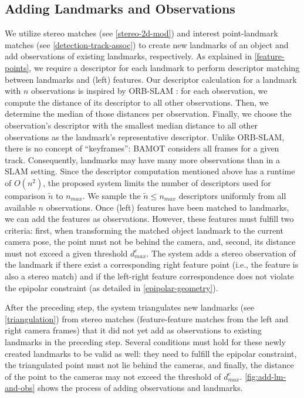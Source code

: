 \documentclass[headsepline, hidelinks, footsepline, footinclude=false, oneside, fontsize=11pt, paper=a4, listof=totoc, bibliography=totoc]{scrbook}
\begin{document}
\subsection{Adding Landmarks and Observations \label{adding-lms-and-obs}}
\label{sec:orgc423021}
    We utilize stereo matches (see \cref{stereo-2d-mod}) and interest point-landmark matches (see \cref{detection-track-assoc}) to create new landmarks of an object and add observations of existing landmarks, respectively.
As explained in \cref{feature-points}, we require a descriptor for each landmark to perform descriptor matching between landmarks and (left) features. 
Our descriptor calculation for a landmark with \(n\) observations is inspired by ORB-SLAM \cite{mur-artalORBSLAMVersatileAccurate2015a,mur-artalORBSLAM2OpenSourceSLAM2017}: 
for each observation, we compute the distance of its descriptor to all other observations. Then, we determine the median of those distances per observation. Finally, 
we choose the observation's descriptor with the smallest median distance to all other observations as the landmark's representative descriptor. 
Unlike ORB-SLAM, there is no concept of ``keyframes'': BAMOT considers all frames for a given track. Consequently, landmarks may have many more observations than in a 
SLAM setting. Since the descriptor computation mentioned above has a runtime of \(O(n^2)\), the proposed system limits the number of descriptors used for comparison \(\tilde{n}\) to \(n_{max}\).
We sample the \(\tilde{n} \leq n_{max}\) descriptors uniformly from all available \(n\) observations.
Once (left) features have been matched to landmarks, we can add the features as observations. 
However, these features must fulfill two criteria: first, when transforming the matched object landmark to the current camera pose,
the point must not be behind the camera, and, second, its distance must not exceed a given threshold \(d_{max}^c\).
The system adds a stereo observation of the landmark if there exist a corresponding right feature point (i.e., the feature is also a stereo match) 
and if the left-right feature correspondence does not violate the epipolar constraint (as detailed in \cref{epipolar-geometry}).

After the preceding step, the system triangulates new landmarks (see \cref{triangulation}) from stereo matches (feature-feature matches from the left and right camera frames) 
that it did not yet add as observations to existing landmarks in the preceding step. 
Several conditions must hold for these newly created landmarks to be valid as well: they need to fulfill the epipolar constraint, the triangulated point must not lie behind the cameras, and finally, the distance of the point to the cameras may not exceed the threshold of \(d_{max}^c\). 
\cref{fig:add-lm-and-obs} shows the process of adding observations and landmarks.
\end{document}
